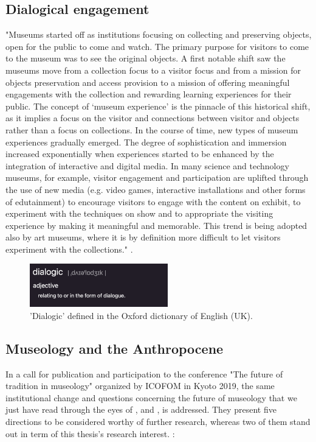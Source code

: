 \subsection{Dialogical engagement}
"Museums started off as institutions focusing on collecting and preserving objects, open for the public to come and watch. The primary purpose for visitors to come to the museum was to see the original objects. A first notable shift saw the museums move from a collection focus to a visitor focus and from a mission for objects preservation and access provision to a mission of offering meaningful engagements with the collection and rewarding learning experiences for their public. The concept of ‘museum experience’ is the pinnacle of this historical shift, as it implies a focus on the visitor and connections between visitor and objects rather than a focus on collections. In the course of time, new types of museum experiences gradually emerged. The degree of sophistication and immersion increased exponentially when experiences started to be enhanced by the integration of interactive and digital media. In many science and technology museums, for example, visitor engagement and participation are uplifted through the use of new media (e.g. video games, interactive installations and other forms of edutainment) to encourage visitors to engage with the content on exhibit, to experiment with the techniques on show and to appropriate the visiting experience by making it meaningful and memorable. This trend is being adopted also by art museums, where it is by definition more difficult to let visitors experiment with the collections." \autocite[p. 3]{vermeeren_museum_2018}.

\begin{figure}[H]
\includegraphics[width=6cm]{pictures/background/dialogic.png}
\caption{'Dialogic' defined in the Oxford dictionary of English (UK).}
\centering
\end{figure}

\subsection{Museology and the Anthropocene}
In a call for publication and participation to the conference "The future of tradition in museology" organized by ICOFOM in Kyoto 2019, the same institutional change and questions concerning the future of museology that we just have read through the eyes of \autocite{ross_interpreting_2015}, \autocite{vergo_museology_1989} and \autocite{vermeeren_museum_2018}, is addressed. They present five directions to be considered worthy of further research, whereas two of them stand out in term of this thesis's research interest. \autocite[p. 4]{icofom_kyoto_2019}:

